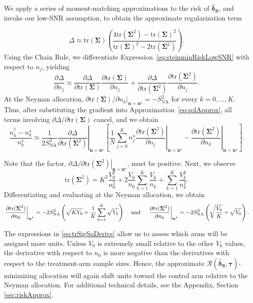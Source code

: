 \documentclass{article}
\newcommand{\bstau}{\boldsymbol \tau}
\newcommand{\bsSig}{\boldsymbol  \Sigma}
\newcommand{\bsn}{\boldsymbol n}
\newcommand{\bsns}{\boldsymbol{n^\star}}
\newcommand{\Tr}{\text{tr}}
\newcommand{\bsdelts}{\boldsymbol {\hat \delta_S}}
\newcommand{\sna}{S_{\text{NA}}}
\begin{document}
We apply a series of moment-matching approximations to the risk of $\bsdelts$, and invoke our low-SNR assumption, to obtain the approximate regularization term  

\begin{equation}\label{eq:steinminRiskLowSNR}
\Delta \approx \Tr(\bsSig) \left( \frac{4\Tr(\bsSig^2)-\Tr(\bsSig)^2}
{\Tr(\bsSig)^2-2\Tr(\bsSig^2)} \right).
\end{equation}
Using the Chain Rule, we differentiate Expression~\eqref{eq:steinminRiskLowSNR} with respect to $n_j$, yielding
\[ \frac{\partial\Delta}{\partial n_j} \approx \frac{\partial\Delta}{\partial\Tr(\bsSig)} \frac{\partial\Tr(\bsSig)}{\partial n_j} + \frac{\partial\Delta}{\partial\Tr(\bsSig^2)} \frac{\partial\Tr(\bsSig^2)}{\partial n_j}. \]
At the Neyman allocation, $\left. \partial\Tr(\bsSig)/\partial n_k\right|_{\bsn=\bsn^\star}
=-\sna^2$
for every $k=0,\dots,K$. Thus, after substituting the gradient into
Approximation~\eqref{eq:solApprox}, all terms involving
$\partial\Delta/\partial\Tr(\bsSig)$ cancel, and we obtain
\[ \frac{n_k^\dag-n_k^\star}{n_k^\star} \approx \frac{1}{2\sna^2} \left. \frac{\partial\Delta}{\partial\Tr(\bsSig^2)} \right|_{\bsn=\bsn^\star} \left[ \frac{1}{N}\sum_{j=0}^K n_j^\star \left. \frac{\partial\Tr(\bsSig^2)}{\partial n_j} \right|_{\bsn=\bsn^\star} - \left. \frac{\partial\Tr(\bsSig^2)}{\partial n_k} \right|_{\bsn=\bsns} \right]. \]

Note that the factor,  $\left.\partial\Delta/\partial\Tr(\bsSig^2)\right|_{\bsn=\bsns}$, must be positive. Next, we observe
\[ \Tr(\bsSig^2) = K^2 \frac{V_0^2}{n_0^2} +2\frac{V_0}{n_0} \sum_{k = 1}^K \frac{V_k}{n_k} + \sum_{k = 1}^K \frac{V_k^2}{n_k^2}. \]
Differentiating and evaluating at the Neyman allocation, we obtain
\begin{equation}\label{eq:trSigSqDerivs}
\left. \frac{\partial \Tr(\bsSig^2)}{\partial n_0}\right|_{\bsns} = -2 \sna^3 \left( \sqrt{K V_0} + \frac{1}{K}\sum_{k = 1}^K \sqrt{V_k} \right) \hspace{3mm} \text{ and } \hspace{3mm}  \left. \frac{\partial \Tr(\bsSig^2)}{\partial n_k}\right|_{\bsns} = -2 \sna^3 \left(\sqrt{\frac{V_0}{K}} + \sqrt{V_k} \right).
\end{equation}

The expressions in \eqref{eq:trSigSqDerivs} allow us to assess which arms will be assigned more units. Unless $V_0$ is extremely small relative to the other $V_k$ values, the derivative with respect to $n_0$ is more negative than the derivatives with respect to the treatment-arm sample sizes. Hence, the approximate $\mathcal{R}(\bsdelts, \bstau)$-minimizing allocation will again shift units toward the control arm relative to the Neyman allocation. For additional technical details, see the Appendix, Section \ref{sec:riskApprox}. 
\end{document}
